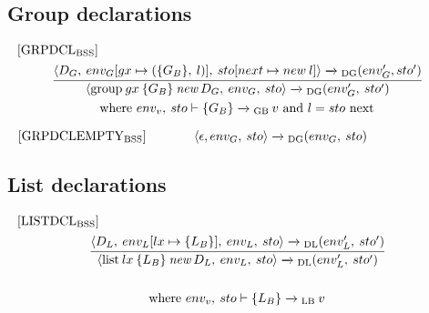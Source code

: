 \subsection*{Group declarations}
\begin{equation}
\begin{split}
\begin{minipage}{\linewidth}
$[\text{GRPDCL}_\text{BSS}]$
\end{minipage}
\\
\begin{minipage}{\linewidth}
\centering
$\cfrac{\langle D_G,  \: env_G[gx \mapsto (\{G_B\}, \: l)], \: sto[next \mapsto new \: l] \rangle \xrightarrow{}\textsubscript{DG} (env'_G, sto')}{\langle\text{group} \: gx \: \{G_B\} \: \textit{new} \: D_G, \: env_G, \: sto \rangle \xrightarrow{}\textsubscript{DG}(env'_G, \: sto')}$
\end{minipage}
\\
\begin{minipage}{\linewidth}
\centering
where $env_v, \: sto \vdash \{G_B\} \xrightarrow{}\textsubscript{GB} \: v \text{ and } l = sto \text{ next}$
\end{minipage}
\end{split}
\end{equation}

\begin{equation}
\begin{minipage}{.2\linewidth}
$[\text{GRPDCLEMPTY}_\text{BSS}]$
\end{minipage}
\begin{minipage}{.8\linewidth}
\centering
$\langle \epsilon, env_G,  \: sto \rangle \xrightarrow{}\textsubscript{DG} (env_G, \: sto)$
\end{minipage}
\end{equation}
\subsection*{List declarations}
\begin{equation}
\begin{split}
\begin{minipage}{\linewidth}
$[\text{LISTDCL}_\text{BSS}]$
\end{minipage}
\\
\begin{minipage}{\linewidth}
\centering
$\cfrac{\langle D_L,  \: env_L[lx \mapsto \{L_B\}], \: env_L, \: sto \rangle \xrightarrow{}\textsubscript{DL} (env'_L, \: sto')}{\langle\text{list} \: lx \: \{L_B\} \: \textit{new} \: D_L, \: env_L, \: sto \rangle \xrightarrow{}\textsubscript{DL}(env'_L, \: sto')}$
\end{minipage}
\\\\
\begin{minipage}{\linewidth}
\centering
where $env_v, \: sto \vdash \{L_B\} \xrightarrow{}\textsubscript{LB} \: v$
\end{minipage}
\end{split}
\end{equation}

